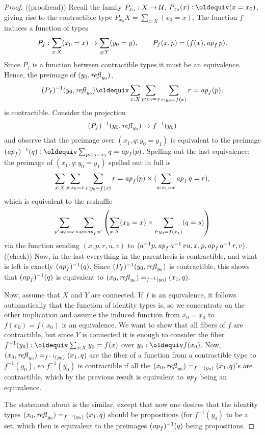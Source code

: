 \begin{proof}
((proofread))
  Recall the family $P_{x_0} : X\to\mathcal{U}$, $P_{x_0}(x)\defequi (x=x_0)$, giving rise to the contractible type $P_{x_0}X=\sum_{x:X}(x_0=x)$.  The function $f$ induces a function of types 
$$P_f:\sum_{x:X}(x_0=x)\to\sum_{y:Y}(y_0=y),\qquad P_f(x,p)=(f(x),\mathop{{\it ap}_{f}} p).$$  Since $P_f$ is a function between contractible types it must be an equivalence.  Hence, the preimage of $(y_0,\mathop{{\it refl}_{y_0}})$, 
$$(P_f)^{-1}(y_0,\refl{y_0})\oldequiv\sum_{x:X}\sum_{p:x_0=x}\sum_{r:y_0=f(x)}r=\ap f(p),$$  
is contractible.  
Consider the projection 
$$(P_f)^{-1}(y_0,\mathop{{\it refl}_{y_0}})\to f^{-1}(y_0)$$ and observe that the preimage over $(x_1,q:y_0=y_1) $ is equivalent to the preimage $(\ap f)^{-1}(q)\defequi\sum_{p:x_0=x_1}q=\ap f(p)$.  Spelling out the last equivalence: the preimage of $(x_1,q:y_0=y_1) $ spelled out in full is
$$\sum_{x:X}\sum_{p:x_0=x}\sum_{r:y_0=f(x)}r=\mathop{{\it ap}_{f}}(p)\times(\sum_{a:x_1=x}\mathop{{\it ap}_{f}} q=r),$$
which is equivalent to the reshuffle
$$\sum_{p':x_0=x}\sum_{s:q=\mathop{{\it ap}_{f}} p'}\left(\sum_{x:X}(x_0=x)\times\sum_{t:y_0=f(x_1)}(q=s)\right)$$
via the function sending $(x,p,r,u,v)$ to $(a^{-1}p,\mathop{{\it ap}_{f}} a^{-1}\,vu,x,p,\mathop{{\it ap}_{f}} a^{-1}\, r,v)$. ((check))  Now, in the last everything in the parenthesis is contractible, and what is left is exactly $(\mathop{{\it ap}_{f}})^{-1}(q)$.  Since $(P_f)^{-1}(y_0,\mathop{{\it refl}_{y_0}})$ is contractible, this shows that $(\mathop{{\it ap}_{f}})^{-1}(q)$ is equivalent to $(x_0,\mathop{{\it refl}_{y_0}})=_{f^{-1}(y_0)}(x_1,q).$

Now, assume that $X$ and $Y$ are connected.   If $f$ is an equivalence, it follows automatically that the function of identity types is, so we concentrate on the other implication and assume the induced function from $x_0=x_0$ to $f(x_0)=f(x_0)$ is an equivalence.  We want to show that all fibers of $f$ are contractible, but since $Y$ is connected it is enough to consider the fiber $f^{-1}(y_0)\defequi\sum_{x:X}y_0=f(x)$ over $y_0\defequi f(x_0)$.  Now, $(x_0,\mathop{{\it refl}_{y_0}})=_{f^{-1}(y_0)}(x_1,q)$ are the fiber of a function from a contractible type to $f^{-1}(y_0)$, so $f^{-1}(y_0)$ is contractible if all the $(x_0,\mathop{{\it refl}_{y_0}})=_{f^{-1}(y_0)}(x_1,q)$'s are contractible, which by the previous result is equivalent to $\mathop{{\it ap}_{f}}$ being an equivalence.  

The statement about \coverings is the similar, except that now one desires that the identity types $(x_0,\mathop{{\it refl}_{y_0}})=_{f^{-1}(y_0)}(x_1,q)$ should be propositions (for $f^{-1}(y_0)$ to be a set, which then is equivalent to the preimages $(\mathop{{\it ap}_{f}})^{-1}(q)$ being propositions.
\end{proof}

